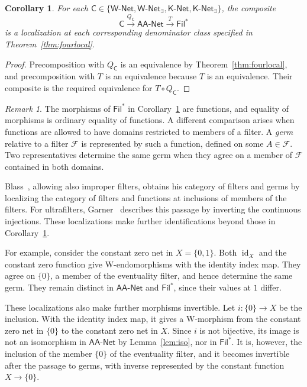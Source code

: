 \documentclass[11pt,a4paper]{article}
\newtheorem{corollary}[theorem]{Corollary}
\theoremstyle{definition}
\theoremstyle{remark}
\newtheorem{remark}[theorem]{Remark}
\newcommand{\Filp}{\mathsf{Fil}^{*}}
\newcommand{\Wpar}{\mathsf{W\text{-}Net}}
\newcommand{\Kpar}{\mathsf{K\text{-}Net}}
\newcommand{\Wex}{\mathsf{W\text{-}Net}_{\exists}}
\newcommand{\Kex}{\mathsf{K\text{-}Net}_{\exists}}
\newcommand{\NetAA}{\mathsf{AA\text{-}Net}}
\newcommand{\FF}{\mathcal F}
\newcommand{\CC}{\mathsf C}
\newcommand{\id}{\operatorname{id}}
\begin{document}
\begin{corollary}\label{cor:filterslocal}
For each \(\CC\in\{\Wpar,\Wex,\Kpar,\Kex\}\), the composite
\[
 \CC\overset{Q_{\CC}}{\rightarrow}\NetAA\overset{T}{\rightarrow}\Filp
\]
is a localization at each corresponding denominator class specified
in Theorem~\ref{thm:fourlocal}.
\end{corollary}
\begin{proof}
Precomposition with \(Q_{\CC}\) is an equivalence by
Theorem~\ref{thm:fourlocal}, and precomposition with \(T\)
is an equivalence because \(T\) is an equivalence. Their composite is the required
equivalence for \(T\circ Q_{\CC}\).
\end{proof}

\begin{remark}\label{rem:germs}
The morphisms of \(\Filp\) in Corollary~\ref{cor:filterslocal}
are functions, and equality of morphisms is ordinary equality of
functions. A different comparison arises when functions are allowed
to have domains restricted to members of a filter. A \emph{germ}
relative to a filter \(\FF\) is represented by such a function,
defined on some \(A\in\FF\). Two representatives determine
the same germ when they agree on a member of \(\FF\) contained in
both domains.

Blass~\cite[Section 1 and Theorem 15]{Blass}, allowing also improper
filters, obtains his category of filters and germs by localizing the
category of filters and functions at inclusions of members
of the filters. For ultrafilters,
Garner~\cite[Section 2.2, Definition 4 and Proposition 5]{Garner}
describes this passage by inverting the continuous injections.
These localizations make further identifications beyond those in
Corollary~\ref{cor:filterslocal}.

For example, consider the constant zero net in \(X=\{0,1\}\).
Both \(\id_X\) and the constant zero function give W-endomorphisms
with the identity index map. They agree on \(\{0\}\), a member of
the eventuality filter, and hence determine the same germ. They
remain distinct in \(\NetAA\) and \(\Filp\), since their values
at \(1\) differ.

These localizations also make further morphisms invertible. Let
\(i:\{0\}\to X\) be the inclusion. With the identity index map, it
gives a W-morphism from the constant zero net in \(\{0\}\) to the
constant zero net in \(X\). Since \(i\) is not bijective, its image
is not an isomorphism in \(\NetAA\) by Lemma~\ref{lem:iso}, nor in
\(\Filp\). It is, however, the inclusion of the member \(\{0\}\) of
the eventuality filter, and it becomes invertible after the passage
to germs, with inverse represented by the constant function
\(X\to\{0\}\).
\end{remark}
\end{document}
